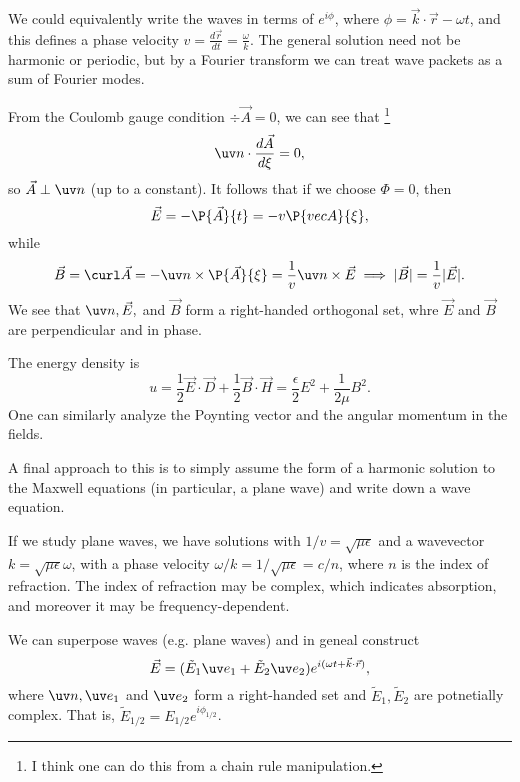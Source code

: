 We could equivalently write the waves in terms of $e^{i\phi}$, where $\phi = \vec k \cdot \vec r - \omega t$, and this defines a phase velocity $v = \frac{d\vec r}{dt} = \frac{\omega}{k}$. The general solution need not be harmonic or periodic, but by a Fourier transform we can treat wave packets as a sum of Fourier modes.

From the Coulomb gauge condition $\div \vec A=0$, we can see that%
    \footnote{I think one can do this from a chain rule manipulation.}
\begin{equation}
    \uv n \cdot \frac{d\vec A}{d\xi}=0,
\end{equation}
so $\vec A \perp \uv n$ (up to a constant). It follows that if we choose $\Phi=0$, then
\begin{equation}
    \vec E = -\P{\vec A}{t} = -v \P{vec A}{\xi},
\end{equation}
while
\begin{equation}
    \vec B = \curl \vec A = -\uv n \times \P{\vec A}{\xi} = \frac{1}{v} \uv n \times \vec E \implies |\vec B| = \frac{1}{v} |\vec E|.
\end{equation}
We see that $\uv n, \vec E,$ and $\vec B$ form a right-handed orthogonal set, whre $\vec E$ and $\vec B$ are perpendicular and in phase.

The energy density is
\begin{equation}
    u=\frac{1}{2} \vec E \cdot \vec D + \frac{1}{2} \vec B \cdot \vec H = \frac{\epsilon}{2} E^2 + \frac{1}{2\mu} B^2.
\end{equation}
One can similarly analyze the Poynting vector and the angular momentum in the fields.

A final approach to this is to simply assume the form of a harmonic solution to the Maxwell equations (in particular, a plane wave) and write down a wave equation.

If we study plane waves, we have solutions with $1/v=\sqrt{\mu\epsilon}$ and a wavevector $k=\sqrt{\mu \epsilon}\omega$, with a phase velocity $\omega/k = 1/\sqrt{\mu \epsilon} =c/n$, where $n$ is the index of refraction. The index of refraction may be complex, which indicates absorption, and moreover it may be frequency-dependent.

We can superpose waves (e.g. plane waves) and in geneal construct
\begin{equation}
    \vec E = (\tilde E_1 \uv e_1 + \tilde E_2 \uv e_2) e^{i(\omega t + \vec k \cdot \vec r)},
\end{equation}
where $\uv n,\uv e_1$ and $\uv e_2$  form a right-handed set and $\tilde E_1,\tilde E_2$ are potnetially complex. That is, $\tilde E_{1/2} = E_{1/2} e^{i\phi_{1/2}}$.

